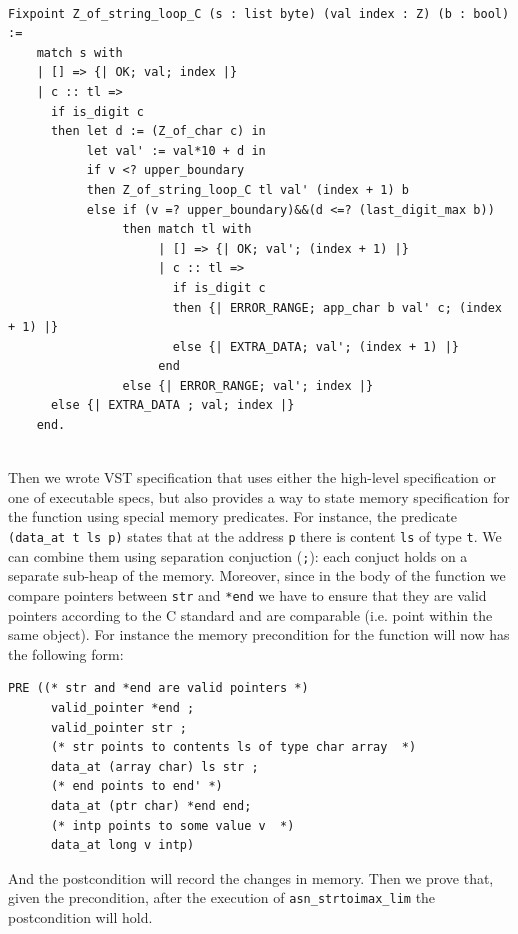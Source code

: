 \documentclass[acmsmall,nonacm]{acmart}
\begin{document}
 \begin{lstlisting}[language=Coq]
 
Fixpoint Z_of_string_loop_C (s : list byte) (val index : Z) (b : bool) := 
    match s with 
    | [] => {| OK; val; index |}
    | c :: tl => 
      if is_digit c
      then let d := (Z_of_char c) in 
           let val' := val*10 + d in
           if v <? upper_boundary 
           then Z_of_string_loop_C tl val' (index + 1) b
           else if (v =? upper_boundary)&&(d <=? (last_digit_max b))
                then match tl with
                     | [] => {| OK; val'; (index + 1) |}
                     | c :: tl => 
                       if is_digit c
                       then {| ERROR_RANGE; app_char b val' c; (index + 1) |}
                       else {| EXTRA_DATA; val'; (index + 1) |}
                     end
                else {| ERROR_RANGE; val'; index |}      
      else {| EXTRA_DATA ; val; index |}              
    end.
    
 \end{lstlisting}

 Then we wrote VST specification that uses either the high-level
 specification or one of executable specs, but also provides a way to
 state memory specification for the function using special memory
 predicates. For instance, the predicate \texttt{(data\_at t ls p)}
 states that at the address \texttt{p} there is content \texttt{ls} of
 type \texttt{t}. We can combine them using separation conjuction
 (\texttt{;}): each conjuct holds on a separate sub-heap of the
 memory. Moreover, since in the body of the function we compare
 pointers between \texttt{str} and \texttt{*end} we have to ensure
 that they are valid pointers according to the C standard and are
 comparable (i.e. point within the same object). For instance the
 memory precondition for the function will now has the following form:
\begin{lstlisting}[language=Coq]
PRE ((* str and *end are valid pointers *)
      valid_pointer *end ;
      valid_pointer str ;
      (* str points to contents ls of type char array  *)
      data_at (array char) ls str ; 
      (* end points to end' *)
      data_at (ptr char) *end end;
      (* intp points to some value v  *)
      data_at long v intp)
     \end{lstlisting}

     And the postcondition will record the changes in memory. Then we
     prove that, given the precondition, after the execution of
     \texttt{asn\_strtoimax\_lim} the postcondition will hold.
           
\end{document}
